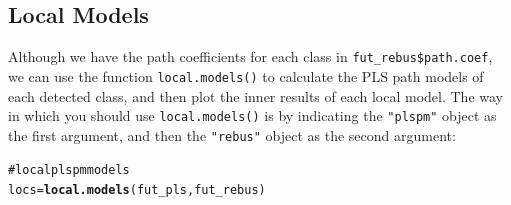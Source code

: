 \documentclass[12pt]{book}\usepackage{graphicx, color}
\makeatletter
\newcommand{\hlfunctioncall}[1]{\textcolor[rgb]{0.501960784313725,0,0.329411764705882}{\textbf{#1}}}%
\newcommand{\hlcomment}[1]{\textcolor[rgb]{0.180392156862745,0.6,0.341176470588235}{#1}}%
\newenvironment{kframe}{%
 \def\at@end@of@kframe{}%
 \ifinner\ifhmode%
  \def\at@end@of@kframe{\end{minipage}}%
  \begin{minipage}{\columnwidth}%
 \fi\fi%
 \def\FrameCommand##1{\hskip\@totalleftmargin \hskip-\fboxsep
 \colorbox{shadecolor}{##1}\hskip-\fboxsep
     \hskip-\linewidth \hskip-\@totalleftmargin \hskip\columnwidth}%
 \MakeFramed {\advance\hsize-\width
   \@totalleftmargin\z@ \linewidth\hsize
   \@setminipage}}%
 {\par\unskip\endMakeFramed%
 \at@end@of@kframe}
\newenvironment{knitrout}{}{} %
\newcommand{\code}[1]{\texttt{#1}}
\makeatother
\begin{document}
\subsection{Local Models}
Although we have the path coefficients for each class in \code{fut\_rebus\$path.coef}, we can use the function \code{local.models()} to calculate the PLS path models of each detected class, and then plot the inner results of each local model. The way in which you should use \code{local.models()} is by indicating the \code{"plspm"} object as the first argument, and then the \code{"rebus"} object as the second argument:
\begin{knitrout}
\color{fgcolor}\begin{kframe}
\begin{alltt}
\hlcomment{# local plspm models}
locs = \hlfunctioncall{local.models}(fut_pls, fut_rebus)


\end{alltt}
\end{kframe}
\end{knitrout}
\end{document}
